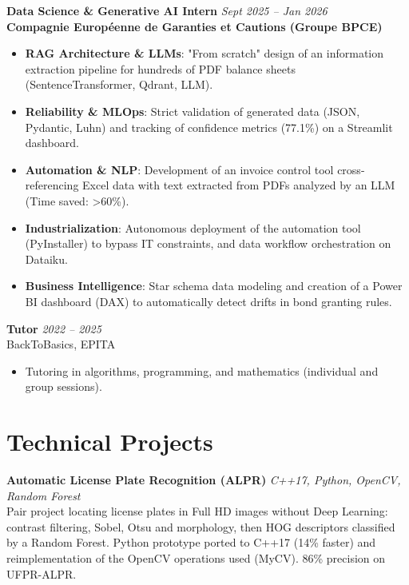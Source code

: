 \documentclass[10pt,a4paper]{article}
\begin{document}
\vspace{0.15cm}

\noindent
\textbf{Data Science \& Generative AI Intern} \hfill \textit{Sept 2025 -- Jan 2026} \\
\textbf{Compagnie Européenne de Garanties et Cautions (Groupe BPCE)}
\begin{itemize}
    \item \textbf{RAG Architecture \& LLMs}: "From scratch" design of an information extraction pipeline for hundreds of PDF balance sheets (SentenceTransformer, Qdrant, LLM).
    \item \textbf{Reliability \& MLOps}: Strict validation of generated data (JSON, Pydantic, Luhn) and tracking of confidence metrics (77.1\%) on a Streamlit dashboard.
    \item \textbf{Automation \& NLP}: Development of an invoice control tool cross-referencing Excel data with text extracted from PDFs analyzed by an LLM (Time saved: >60\%).
    \item \textbf{Industrialization}: Autonomous deployment of the automation tool (PyInstaller) to bypass IT constraints, and data workflow orchestration on Dataiku.
    \item \textbf{Business Intelligence}: Star schema data modeling and creation of a Power BI dashboard (DAX) to automatically detect drifts in bond granting rules.
\end{itemize}

\vspace{0.15cm}

\noindent
\textbf{Tutor} \hfill \textit{2022 -- 2025} \\
BackToBasics, EPITA
\begin{itemize}
    \item Tutoring in algorithms, programming, and mathematics (individual and group sessions).
\end{itemize}

\section*{Technical Projects}

\noindent
\textbf{Automatic License Plate Recognition (ALPR)} \hfill \textit{C++17, Python, OpenCV, Random Forest} \\
Pair project locating license plates in Full HD images without Deep Learning: contrast filtering, Sobel, Otsu and morphology, then HOG descriptors classified by a Random Forest. Python prototype ported to C++17 (14\% faster) and reimplementation of the OpenCV operations used (MyCV). 86\% precision on UFPR-ALPR.
\end{document}
